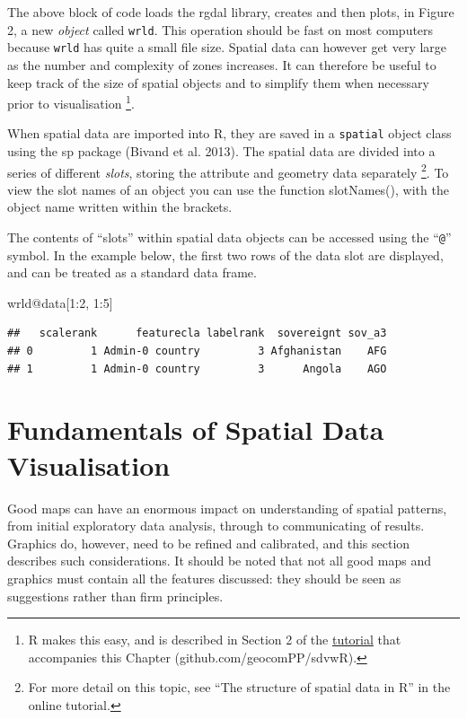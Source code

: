 \documentclass[]{article}
\newenvironment{Shaded}{}{}
\newcommand{\DecValTok}[1]{\textcolor[rgb]{0.25,0.63,0.44}{{#1}}}
\newcommand{\NormalTok}[1]{{#1}}
\begin{document}
The above block of code loads the rgdal library, creates and then plots, in Figure 2, a new
\emph{object} called \texttt{wrld}. This operation should be fast on most computers because
\texttt{wrld} has quite a small file size. Spatial data can however get very large as the number and complexity of zones increases. It can therefore be useful to keep track of the size of spatial objects and to
simplify them when necessary prior to visualisation \footnote{R makes this easy, and is described in Section
2 of the
\href{https://github.com/geocomPP/sdvwR/blob/master/sdv-tutorial.pdf?raw=true}{tutorial}
that accompanies this Chapter (github.com/geocomPP/sdvwR).
}.

When spatial data are imported into R, they are saved in a
\texttt{spatial} object class using the sp package (Bivand et al.
2013). The spatial data are divided into a series of different
\emph{slots}, storing the attribute and geometry data separately \footnote{For more detail on this
topic, see ``The structure of spatial data in R'' in the online
tutorial.}. To view the slot names of an object you can use the function slotNames(), with the object name written within the brackets.

The contents of ``slots'' within spatial data objects can be accessed using the ``\texttt{@}'' symbol. In the example below, the first two rows of the data slot are displayed, and can be treated as a standard data frame.


\begin{Shaded}
\begin{Highlighting}[]
\NormalTok{wrld@data[}\DecValTok{1}\NormalTok{:}\DecValTok{2}\NormalTok{, }\DecValTok{1}\NormalTok{:}\DecValTok{5}\NormalTok{]}
\end{Highlighting}
\end{Shaded}
\begin{verbatim}
##   scalerank      featurecla labelrank  sovereignt sov_a3
## 0         1 Admin-0 country         3 Afghanistan    AFG
## 1         1 Admin-0 country         3      Angola    AGO
\end{verbatim}

\section{Fundamentals of Spatial Data Visualisation}

Good maps can have an enormous impact on understanding of spatial patterns, 
from initial exploratory data analysis, through to communicating of results.
Graphics do, however, need to be refined and calibrated, and this section describes
such considerations. It should be
noted that not all good maps and graphics must
contain all the features discussed: they should be seen as suggestions
rather than firm principles.
\end{document}
